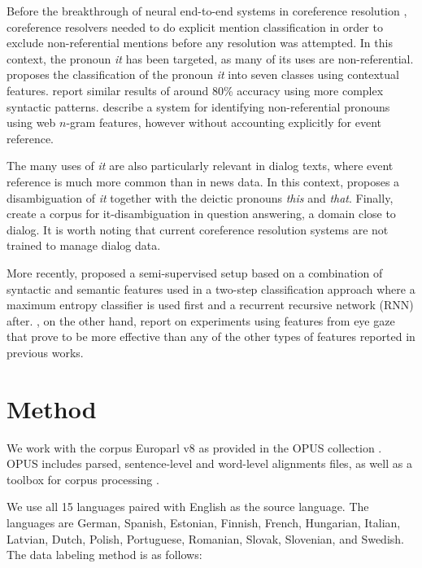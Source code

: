 \documentclass[10pt, a4paper]{article}
\begin{document}
%
% 
Before the breakthrough of neural end-to-end systems in coreference resolution
\cite{Lee:2017}, coreference resolvers needed to do explicit mention
classification in order to exclude non-referential mentions before any
resolution was attempted. In this context, the pronoun \textit{it} has been targeted,
as many of its uses are non-referential.  proposes the
classification of the pronoun \textit{it} into seven classes using contextual features.
 report similar results of around 80\% accuracy using more
complex syntactic patterns.  describe a system for
identifying non-referential pronouns using web $n$-gram features, however
without accounting explicitly for event reference.

The many uses of \textit{it} are also particularly relevant in dialog texts, where
event reference is much more common than in news data. In this context,
 proposes a disambiguation of \textit{it} together with
the deictic pronouns \textit{this} and \textit{that}.  Finally,  create a corpus
for it-disambiguation in question answering, a domain close to dialog. It is
worth noting that current coreference resolution systems are not trained to
manage dialog data.

More recently,   proposed a semi-supervised setup
based on a combination of syntactic and semantic features used in a two-step
classification approach where a maximum entropy classifier is used first and a
recurrent recursive network (RNN) after. ,
on the other hand, report on experiments using features from eye gaze that prove
to be more effective than any of the other types of features reported in
previous works.




\section{Method}

We work with the corpus Europarl \cite{Koehn2005} v8 as provided in the OPUS 
collection \cite{TIEDEMANN12.463}. OPUS includes parsed, sentence-level 
and word-level alignments files, as well as a toolbox for corpus processing 
\cite{aulamo-et-al-opus}. 

We use all 15 languages paired with English as the 
source language. The languages are German, Spanish, Estonian, Finnish, French, 
Hungarian, Italian, Latvian, Dutch, Polish, Portuguese, Romanian, Slovak, 
Slovenian, and Swedish. The data labeling method is as follows:
\end{document}
